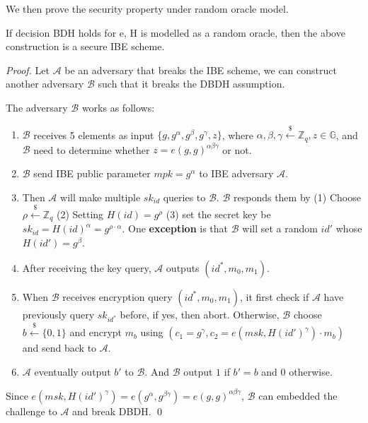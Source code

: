 We then prove the security property under random oracle model.
\begin{theorem}
    If decision BDH holds for e, H is modelled as a random oracle, then the above construction is a secure IBE scheme. 
\end{theorem}
\begin{proof}
    Let $\mathcal{A}$ be an adversary that breaks the IBE scheme, we can construct another adversary $\mathcal{B}$ such that it breaks the DBDH assumption.

    The adversary $\mathcal{B}$ works as follows:
    \begin{enumerate}
        \item $\mathcal{B}$ receives 5 elements as input $\{g, g^{\alpha},g^{\beta},g^{\gamma},z\}$, where $\alpha,\beta,\gamma\stackrel{\$}{\gets}\mathbb{Z}_q,z\in\mathbb{G}$, and $\mathcal{B}$ need to determine whether $z=e(g,g)^{\alpha\beta\gamma}$ or not. 
        \item $\mathcal{B}$ send IBE public parameter $mpk=g^{\alpha}$ to IBE adversary $\mathcal{A}$.
        \item Then $\mathcal{A}$ will make multiple $sk_{id}$ queries to $\mathcal{B}$. $\mathcal{B}$ responds them by (1) Choose $\rho\stackrel{\$}{\gets}\mathbb{Z}_q$ (2) Setting $H(id)=g^{\rho}$ (3) set the secret key be $sk_{id}=H(id)^{\alpha}=g^{\rho\cdot\alpha}$. One \textbf{exception} is that $\mathcal{B}$ will set a random $id'$ whose $H(id')=g^\beta$.
        \item After receiving the key query, $\mathcal{A}$ outputs $(id^{*}, m_0,m_1)$.  
        \item When $\mathcal{B}$ receives encryption query $(id^{*}, m_0, m_1)$, it first check if $\mathcal{A}$ have previously query $sk_{id^*}$ before, if yes, then abort. Otherwise, $\mathcal{B}$ choose $b\stackrel{\$}{\gets}\{0,1\}$ and encrypt $m_b$ using $(c_1=g^\gamma, c_2=e(msk,H(id')^\gamma)\cdot m_b)$ and send back to $\mathcal{A}$.
        \item $\mathcal{A}$ eventually output $b'$ to $\mathcal{B}$. And $\mathcal{B}$ output $1$ if $b'=b$ and $0$ otherwise. 
    \end{enumerate}
    Since $e(msk,H(id')^{\gamma})=e(g^\alpha,g^{\beta\gamma})=e(g,g)^{\alpha\beta\gamma}$, $\mathcal{B}$ can embedded the challenge to $\mathcal{A}$ and break DBDH. \qed
\end{proof}

